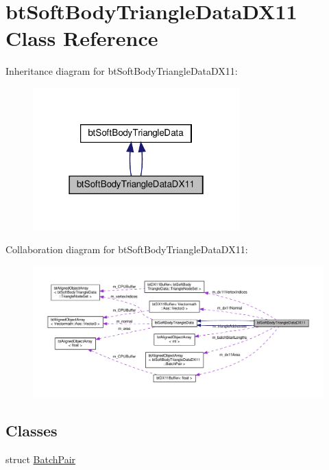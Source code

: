 \hypertarget{classbtSoftBodyTriangleDataDX11}{}\section{bt\+Soft\+Body\+Triangle\+Data\+D\+X11 Class Reference}
\label{classbtSoftBodyTriangleDataDX11}


Inheritance diagram for bt\+Soft\+Body\+Triangle\+Data\+D\+X11\+:
\nopagebreak
\begin{figure}[H]
\begin{center}
\leavevmode
\includegraphics[width=226pt]{classbtSoftBodyTriangleDataDX11__inherit__graph}
\end{center}
\end{figure}


Collaboration diagram for bt\+Soft\+Body\+Triangle\+Data\+D\+X11\+:
\nopagebreak
\begin{figure}[H]
\begin{center}
\leavevmode
\includegraphics[width=350pt]{classbtSoftBodyTriangleDataDX11__coll__graph}
\end{center}
\end{figure}
\subsection*{Classes}
\begin{DoxyCompactItemize}
\item 
struct \hyperlink{structbtSoftBodyTriangleDataDX11_1_1BatchPair}{Batch\+Pair}
\end{DoxyCompactItemize}
